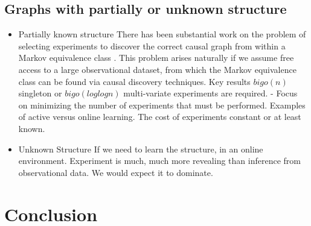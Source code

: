 \subsection{Graphs with partially or unknown structure}

\begin{itemize}

\item Partially known structure
There has been substantial work on the problem of selecting experiments to discover the correct causal graph from within a Markov equivalence class \cite{Eberhardt2005,eberhardt2010causal,hauser2014two,Hu2014}. This problem arises naturally if we assume free access to a large observational dataset, from which the Markov equivalence class can be found via causal discovery techniques. Key results $bigo(n)$ singleton or $bigo(log log n)$ multi-variate experiments are required.
- Focus on minimizing the number of experiments that must be performed. Examples of active versus online learning. The cost of experiments constant or at least known. 

\item Unknown Structure
If we need to learn the structure, in an online environment. 
Experiment is much, much more revealing than inference from observational data. We would expect it to dominate. 

\end{itemize}
\section{Conclusion}

